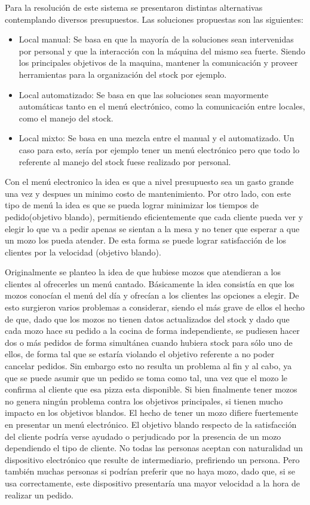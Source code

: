 \documentclass[a4paper,10pt]{article}
\begin{document}
Para la resoluci\'on de este sistema se presentaron distintas alternativas contemplando diversos presupuestos. Las soluciones propuestas son las siguientes:
\begin{itemize}
\item Local manual: Se basa en que la mayor\'ia de la soluciones sean intervenidas por personal y que la interacci\'on con la m\'aquina del mismo sea fuerte.
Siendo los principales objetivos de la maquina, mantener la comunicaci\'on y proveer herramientas para la organizaci\'on del stock por ejemplo.
\item Local automatizado: Se basa en que las soluciones sean mayormente autom\'aticas tanto en el men\'u electr\'onico, como la comunicaci\'on entre locales, como el manejo del stock.
\item Local mixto: Se basa en una mezcla entre el manual y el automatizado. Un caso para esto, ser\'ia por ejemplo tener un men\'u electr\'onico pero que todo lo referente al manejo del stock fuese realizado por personal.
\end{itemize}


Con el men\'u electronico la idea es que a nivel presupuesto sea un gasto grande una vez y despues un minimo costo de mantenimiento. 
Por otro lado, con este tipo de men\'u la idea es que se pueda lograr minimizar los tiempos de pedido(objetivo blando), 
permitiendo eficientemente que cada cliente pueda ver y elegir lo que va a pedir apenas se sientan a la mesa y no tener que esperar a 
que un mozo los pueda atender. De esta forma se puede lograr satisfacci\'on de los clientes por la velocidad (objetivo blando). 


Originalmente se planteo la idea de que hubiese mozos que atendieran a los clientes al ofrecerles un menú cantado.
 Básicamente la idea consistía en que los mozos conocían el menú del día y ofrecían a los clientes las opciones a elegir.
 De esto surgieron varios problemas a considerar, siendo el más grave de ellos el hecho de que, dado que los mozos no tienen datos
 actualizados del stock y dado que cada mozo hace su pedido a la cocina de forma independiente, se pudiesen hacer dos o más pedidos de
 forma simultánea cuando hubiera stock para sólo uno de ellos, de forma tal que se estaría violando el objetivo referente a no poder 
cancelar pedidos. Sin embargo esto no resulta un problema al fin y al cabo, ya que se puede asumir que un pedido se toma como tal, una vez
que el mozo le confirma al cliente que esa pizza esta disponible. Si bien finalmente tener mozos no genera ning\'un problema contra los objetivos
principales, si tienen mucho impacto en los objetivos blandos. El hecho de tener un mozo difiere fuertemente en presentar un men\'u electr\'onico.
El objetivo blando respecto de la satisfacci\'on del cliente podr\'ia verse ayudado o perjudicado por la presencia de un mozo dependiendo el
tipo de cliente. No todas las personas aceptan con naturalidad un dispositivo electr\'onico que resulte de intermediario, prefiriendo un persona. Pero
tambi\'en muchas personas si podr\'ian preferir que no haya mozo, dado que, si se usa correctamente, este dispositivo presentar\'ia una mayor velocidad
a la hora de realizar un pedido.
\end{document}
